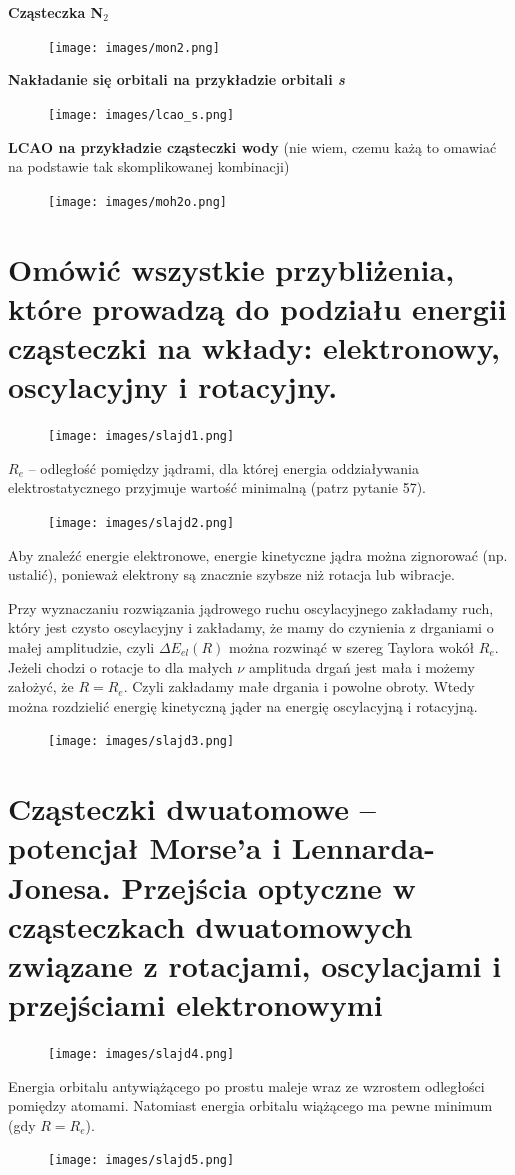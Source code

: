 \documentclass{article}
\begin{document}
\textbf{Cząsteczka N$_2$}
\begin{figure}[H]
    \centering
    \texttt{[image: images/mon2.png]}
\end{figure}

\textbf{Nakładanie się orbitali na przykładzie orbitali \textit{s}}
\begin{figure}[H]
    \centering
    \texttt{[image: images/lcao\_s.png]}
\end{figure}

\textbf{LCAO na przykładzie cząsteczki wody} (nie wiem, czemu każą to omawiać na podstawie tak skomplikowanej kombinacji)
\begin{figure}[H]
    \centering
    \texttt{[image: images/moh2o.png]}
\end{figure} 

\section{Omówić wszystkie przybliżenia, które prowadzą do podziału energii cząsteczki na wkłady: elektronowy, oscylacyjny i rotacyjny.}
\begin{figure}[H]
    \centering
    \texttt{[image: images/slajd1.png]}
\end{figure} 
$R_e$ -- odległość pomiędzy jądrami, dla której energia oddziaływania elektrostatycznego przyjmuje wartość minimalną (patrz pytanie 57).
\begin{figure}[H]
    \centering
    \texttt{[image: images/slajd2.png]}
\end{figure} 
Aby znaleźć energie elektronowe, energie kinetyczne jądra można zignorować (np. ustalić), ponieważ elektrony są znacznie szybsze niż rotacja lub wibracje.

Przy wyznaczaniu rozwiązania jądrowego ruchu oscylacyjnego zakładamy ruch, który jest czysto oscylacyjny i zakładamy, że mamy do czynienia z drganiami o małej amplitudzie, czyli $\Delta E_{el}(R)$ można rozwinąć w szereg Taylora wokół $R_e$. Jeżeli chodzi o rotacje to dla małych $\nu$ amplituda drgań jest mała i możemy założyć, że $R=R_e$. Czyli zakładamy małe drgania i powolne obroty. Wtedy można rozdzielić energię kinetyczną jąder na energię oscylacyjną i rotacyjną.
\begin{figure}[H]
    \centering
    \texttt{[image: images/slajd3.png]}
\end{figure}

\section{Cząsteczki dwuatomowe -- potencjał Morse'a i Lennarda-Jonesa. Przejścia optyczne w cząsteczkach dwuatomowych związane z rotacjami, oscylacjami i przejściami elektronowymi}
\begin{figure}[H]
    \centering
    \texttt{[image: images/slajd4.png]}
\end{figure}
Energia orbitalu antywiążącego po prostu maleje wraz ze wzrostem odległości pomiędzy atomami. Natomiast energia orbitalu wiążącego ma pewne minimum (gdy $R=R_e$). 
\begin{figure}[H]
    \centering
    \texttt{[image: images/slajd5.png]}
\end{figure}
\end{document}
